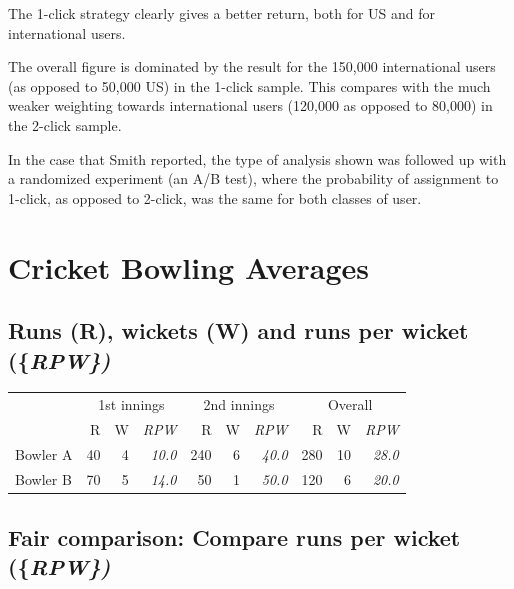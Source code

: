 \documentclass[
  10pt,
  b5paper]{book}
\begin{document}
The 1-click strategy clearly gives a better return, both for US
and for international users.

The overall figure is dominated by the result for the 150,000
international users (as opposed to 50,000 US) in the 1-click
sample. This compares with the much weaker weighting towards
international users (120,000 as opposed to 80,000) in the
2-click sample.

In the case that Smith reported, the type of analysis shown was
followed up with a randomized experiment (an A/B test), where
the probability of assignment to 1-click, as opposed to 2-click,
was the same for both classes of user.

\hypertarget{cricket-bowling-averages}{%
\section{Cricket Bowling Averages}\label{cricket-bowling-averages}}

\hypertarget{runs-r-wickets-w-and-runs-per-wicket}{%
\subsection*{\texorpdfstring{Runs (R), wickets (W) and runs per wicket (\{\em RPW\})}{Runs (R), wickets (W) and runs per wicket (\{\})}}\label{runs-r-wickets-w-and-runs-per-wicket}}

\vspace*{-8pt}

\begin{center}
\begin{tabular}{lrrr||rrr||rrr}
\hline
 & \multicolumn{3}{c}{1st innings} & \multicolumn{3}{c}{2nd innings} &
\multicolumn{3}{c}{Overall} \\
\cline{2-4} \cline{5-7} \cline{8-10}
& R & W & {\em RPW}   & R & W & {\em RPW} & R & W
& {\em RPW}\\
Bowler A & 40 & 4 & {\em 10.0} & 240 & 6 & {\em 40.0} & 280 & 10 &
{\em 28.0}\\
Bowler B & 70 & 5 & {\em 14.0} & 50 & 1 & {\em 50.0} & 120 & 6 & {\em 20.0} \\
\hline
\end{tabular}
\end{center}

\hypertarget{fair-comparison-compare-runs-per-wicket}{%
\subsection*{\texorpdfstring{Fair comparison: Compare runs per wicket (\{\em RPW\})}{Fair comparison: Compare runs per wicket (\{\})}}\label{fair-comparison-compare-runs-per-wicket}}
\end{document}

